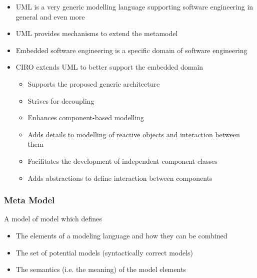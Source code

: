 \begin{itemize}
    \item UML is a very generic modelling language supporting software engineering in general and even more
    \item UML provides mechanisms to extend the metamodel
    \item Embedded software engineering is a specific domain of software engineering
    \item CIRO extends UML to better support the embedded domain
          \begin{itemize}
              \item Supports the proposed generic architecture
              \item Strives for decoupling
              \item Enhances component-based modelling
              \item Adds details to modelling of reactive objects and interaction between them
              \item Facilitates the development of independent component classes
              \item Adds abstractions to define interaction between components
          \end{itemize}
\end{itemize}

\subsubsection{Meta Model}
A model of model which defines
\begin{itemize}
    \item The elements of a modeling language and how they can be combined
    \item The set of potential models (syntactically correct models)
    \item The semantics (i.e. the meaning) of the model elements
\end{itemize}

